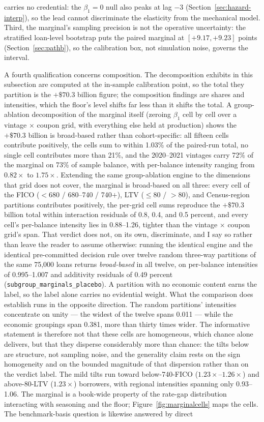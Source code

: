 \documentclass[12pt]{article}
\begin{document}
carries no credential: the $\beta_1 = 0$ null also peaks at lag $-3$ (Section~\ref{sec:hazard-interp}), so the lead cannot discriminate the elasticity from the mechanical model. Third, the marginal's sampling precision is not the operative uncertainty: the stratified loan-level bootstrap puts the paired marginal at $[+9.17, +9.23]$ points (Section~\ref{sec:pathb}), so the calibration box, not simulation noise, governs the interval.

A fourth qualification concerns composition. The decomposition exhibits in this subsection are computed at the in-sample calibration point, so the total they partition is the $+\$70.3$ billion figure; the composition findings are shares and intensities, which the floor's level shifts far less than it shifts the total. A group-ablation decomposition of the marginal itself (zeroing $\beta_1$ cell by cell over a vintage $\times$ coupon grid, with everything else held at production) shows the $+\$70.3$ billion is broad-based rather than cohort-specific: all fifteen cells contribute positively, the cells sum to within 1.03\% of the paired-run total, no single cell contributes more than 21\%, and the 2020--2021 vintages carry 72\% of the marginal on 73\% of sample balance, with per-balance intensity ranging from $0.82\times$ to $1.75\times$. Extending the same group-ablation engine to the dimensions that grid does not cover, the marginal is broad-based on all three: every cell of the FICO ($<$680 / 680--740 / 740$+$), LTV ($\leq$80 / $>$80), and Census-region partitions contributes positively, the per-grid cell sums reproduce the $+\$70.3$ billion total within interaction residuals of 0.8, 0.4, and 0.5 percent, and every cell's per-balance intensity lies in 0.88--1.26, tighter than the vintage $\times$ coupon grid's span. That verdict does not, on its own, discriminate, and I say so rather than leave the reader to assume otherwise: running the identical engine and the identical pre-committed decision rule over twelve random three-way partitions of the same 75,000 loans returns \emph{broad-based} in all twelve, on per-balance intensities of 0.995--1.007 and additivity residuals of 0.49 percent (\texttt{subgroup\_marginals\_placebo}). A partition with no economic content earns the label, so the label alone carries no evidential weight. What the comparison does establish runs in the opposite direction. The random partitions' intensities concentrate on unity --- the widest of the twelve spans 0.011 --- while the economic groupings span 0.381, more than thirty times wider. The informative statement is therefore not that these cells are homogeneous, which chance alone delivers, but that they disperse considerably more than chance: the tilts below are structure, not sampling noise, and the generality claim rests on the sign homogeneity and on the bounded magnitude of that dispersion rather than on the verdict label. The mild tilts run toward below-740-FICO ($1.23\times$--$1.26\times$) and above-80-LTV ($1.23\times$) borrowers, with regional intensities spanning only 0.93--1.06. The marginal is a book-wide property of the rate-gap distribution interacting with seasoning and the floor; Figure~\ref{fig:marginalcells} maps the cells. The benchmark-basis question is likewise answered by direct 
\end{document}
